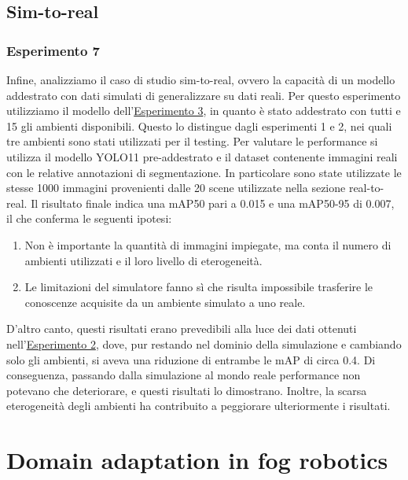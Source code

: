 \documentclass[12pt]{report}
\begin{document}
\subsection{Sim-to-real}
\label{sec:sim_to_real}

\subsubsection{Esperimento 7}
\label{sec:esperimento_7}

Infine, analizziamo il caso di studio sim-to-real, ovvero la capacità di un modello addestrato con dati simulati di generalizzare su dati reali. Per questo esperimento utilizziamo il modello dell'\hyperref[sec:esperimento_3]{Esperimento 3}, in quanto è stato addestrato con tutti e 15 gli ambienti disponibili. Questo lo distingue dagli esperimenti 1 e 2, nei quali tre ambienti sono stati utilizzati per il testing. Per valutare le performance si utilizza il modello YOLO11 pre-addestrato e il dataset contenente immagini reali con le relative annotazioni di segmentazione. In particolare sono state utilizzate le stesse 1000 immagini provenienti dalle 20 scene utilizzate nella sezione real-to-real. Il risultato finale indica una  mAP50 pari a 0.015 e una mAP50-95 di 0.007, il che conferma le seguenti ipotesi:

\begin{enumerate}
	\item Non è importante la quantità di immagini impiegate, ma conta il numero di ambienti utilizzati e il loro livello di eterogeneità.
	
	\item Le limitazioni del simulatore fanno sì che risulta impossibile trasferire le conoscenze acquisite da un ambiente simulato a uno reale. 
\end{enumerate}

D'altro canto, questi risultati erano prevedibili alla luce dei dati ottenuti nell'\hyperref[sec:esperimento_2]{Esperimento 2}, dove, pur restando nel dominio della simulazione e cambiando solo gli ambienti, si aveva una riduzione di entrambe le mAP di circa 0.4. Di conseguenza, passando dalla simulazione al mondo reale performance non potevano che deteriorare, e questi risultati lo dimostrano. Inoltre, la scarsa eterogeneità degli ambienti ha contribuito a peggiorare ulteriormente i risultati.

\section{Domain adaptation in fog robotics}
\label{sec:domain_shift_in_contesto_fog_robotics}
\end{document}
